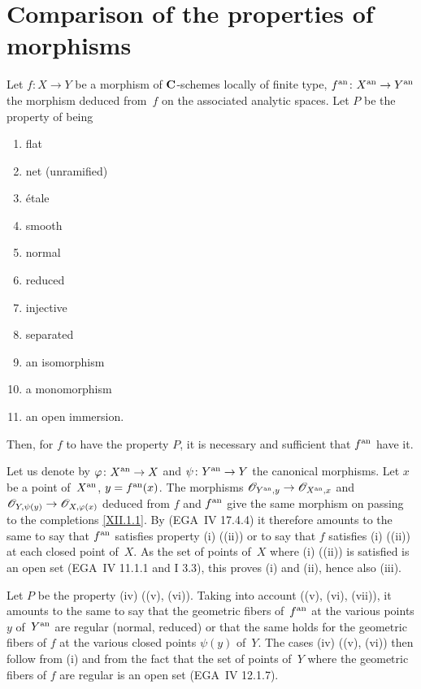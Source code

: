 \section{Comparison of the properties of morphisms}
\label{XII.3}

\begin{proposition}
\label{XII.3.1} Let $f \colon X \to Y$ be a morphism of
$\mathbf{C}$-schemes locally of finite type, $f^\an \colon X^\an \to
Y^\an$ the morphism deduced from~$f$ on the associated
analytic spaces. Let $P$ be the property of being
\begin{enumerate}
\item[(i)] flat
\item[(ii)] net (\ie unramified)
\item[(iii)] étale
\item[(iv)] smooth
\item[(v)] normal
\item[(vi)]
reduced
\item[(vii)] injective
\item[(viii)] separated
\item[(ix)] an isomorphism
\item[(x)] a monomorphism
\item[(xi)] an open immersion.
\end{enumerate}
Then, for $f$ to have the property $P$, it is necessary and
sufficient that $f^{\mathrm{an}}$ have it.
\end{proposition}

Let us denote by $\varphi \colon X^\an \to X $ and $\psi \colon Y^\an \to Y$ the
canonical morphisms. Let $x$ be a point of~$X^{\mathrm{an}}$, $y = f^{\mathrm{an}}
(x)$. The morphisms $\cal{O}_{Y^\an, y} \to {\mathcal O}_{X^\an, x}$
and $\cal{O}_{Y, \psi(y)} \to \cal{O}_{X, \varphi(x)} $ deduced from
$f$ and $f^{\mathrm{an}}$ give the same morphism on passing to the
completions \eqref{XII.1.1}. By \cite[ch \S 5 prop]{XII.2}
(\resp EGA~IV 17.4.4) it therefore amounts to the same to say that $f^{\mathrm{an}} $
satisfies property (i) (\resp (ii)) or to say that $f$
satisfies (i) (\resp (ii)) at each closed point of~$X$. As
the set of points of~$X$ where (i) (\resp (ii)) is
satisfied is an open set (EGA~IV 11.1.1 and I 3.3), this
proves (i) and (ii), hence also (iii).

Let $P$ be the property (iv) (\resp (v), \resp (vi)). Taking into account
 ((v), (vi), (vii)), it amounts to the same to say that
the geometric fibers of~$f^{\mathrm{an}}$ at the various points
$y$ of~$Y^{\mathrm{an}}$ are regular (\resp normal, \resp reduced) or that the same holds for the geometric fibers of
$f$ at the various closed points $\psi (y)$ of~$Y$. The cases
(iv) (\resp (v), \resp (vi)) then follow from (i) and from the fact that
the set of points of~$Y$ where the geometric fibers of
$f$ are regular is an open set (EGA~IV 12.1.7).

